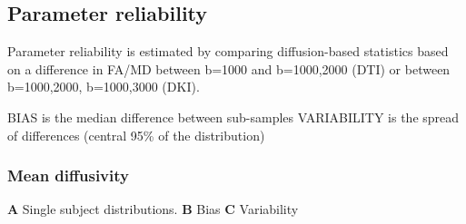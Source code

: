 \documentclass[a0, landscape]{a0poster}
\begin{document}
\begin{multicols}{3}
\subsection*{Parameter reliability}

\noindent Parameter reliability is estimated by comparing diffusion-based
statistics based on a difference in FA/MD between b=1000 and b=1000,2000 (DTI)
or between b=1000,2000, b=1000,3000 (DKI).

\noindent BIAS is the median difference between sub-samples VARIABILITY is
the spread of differences (central 95\% of the distribution)

\subsubsection*{Mean diffusivity}

\textbf{A} Single subject distributions. \textbf{B} Bias \textbf{C} Variability


\end{multicols}
\end{document}
